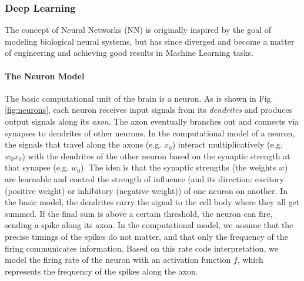 \documentclass[10pt,twocolumn,letterpaper]{article}
\begin{document}
\subsubsection{Deep Learning}
	The concept of Neural Networks (NN) is originally inspired by the goal of modeling biological neural systems, but has since diverged and become a matter of engineering and achieving good results in Machine Learning tasks.

\paragraph{The Neuron Model}
	The basic computational unit of the brain is a neuron. As is shown in Fig. \ref{fig:neurons}, each neuron receives input signals from its \emph{dendrites} and produces output signals along its \emph{axon}. The axon eventually branches out and connects via synapses to dendrites of other neurons. In the computational model of a neuron, the signals that travel along the axons (e.g. $x_0$) interact multiplicatively (e.g. $w_0 x_0$) with the dendrites of the other neuron based on the synaptic strength at that synapse (e.g. $w_0$). The idea is that the synaptic strengths (the weights $w$) are learnable and control the strength of influence (and its direction: excitory (positive weight) or inhibitory (negative weight)) of one neuron on another. In the basic model, the dendrites carry the signal to the cell body where they all get summed. If the final sum is above a certain threshold, the neuron can fire, sending a spike along its axon. In the computational model, we assume that the precise timings of the spikes do not matter, and that only the frequency of the firing communicates information. Based on this rate code interpretation, we model the firing rate of the neuron with an activation function $f$, which represents the frequency of the spikes along the axon. \cite{neuronModel}
\end{document}

